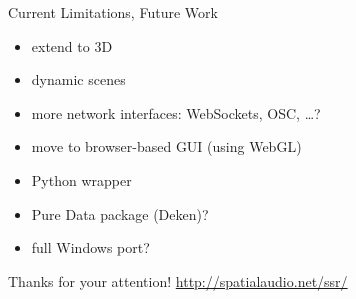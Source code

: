 \documentclass{beamer}
\begin{document}
\begin{frame}%
\begin{center}
\end{center}
\end{frame}

\begin{frame}{Current Limitations, Future Work}
\begin{itemize}
\item extend to 3D
\item dynamic scenes
\item more network interfaces: WebSockets, OSC, \dots?
\item move to browser-based GUI (using WebGL)
\item Python wrapper
\item Pure Data package (Deken)?
\item full Windows port?
\end{itemize}
\end{frame}

\begin{frame}
\begin{center}
Thanks for your attention!
\vfill
\url{http://spatialaudio.net/ssr/}
\vfill
\end{center}
\end{frame}
\end{document}
